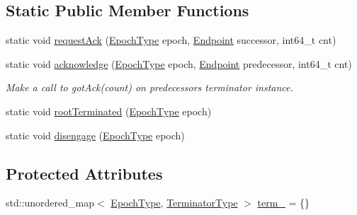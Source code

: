 \subsection*{Static Public Member Functions}
\begin{DoxyCompactItemize}
\item 
static void \hyperlink{structvt_1_1term_1_1ds_1_1_state_d_s_acdf0151492a1e35c6565c65b138e8ac9}{request\+Ack} (\hyperlink{namespacevt_a81d11b28122d43bf9834577e4a06440f}{Epoch\+Type} epoch, \hyperlink{structvt_1_1term_1_1ds_1_1_state_d_s_aba302de614dd639f5d93f4f5b6dd6108}{Endpoint} successor, int64\+\_\+t cnt)
\item 
static void \hyperlink{structvt_1_1term_1_1ds_1_1_state_d_s_a60aafca7a5eef1368e55c02508a0f3bf}{acknowledge} (\hyperlink{namespacevt_a81d11b28122d43bf9834577e4a06440f}{Epoch\+Type} epoch, \hyperlink{structvt_1_1term_1_1ds_1_1_state_d_s_aba302de614dd639f5d93f4f5b6dd6108}{Endpoint} predecessor, int64\+\_\+t cnt)
\begin{DoxyCompactList}\small\item\em Make a call to got\+Ack(count) on predecessor\textquotesingle{}s terminator instance. \end{DoxyCompactList}\item 
static void \hyperlink{structvt_1_1term_1_1ds_1_1_state_d_s_a26ae9b485dbb46e46b48e73a321cfd8b}{root\+Terminated} (\hyperlink{namespacevt_a81d11b28122d43bf9834577e4a06440f}{Epoch\+Type} epoch)
\item 
static void \hyperlink{structvt_1_1term_1_1ds_1_1_state_d_s_a55a5290621f7de06a421793daba374e8}{disengage} (\hyperlink{namespacevt_a81d11b28122d43bf9834577e4a06440f}{Epoch\+Type} epoch)
\end{DoxyCompactItemize}
\subsection*{Protected Attributes}
\begin{DoxyCompactItemize}
\item 
std\+::unordered\+\_\+map$<$ \hyperlink{namespacevt_a81d11b28122d43bf9834577e4a06440f}{Epoch\+Type}, \hyperlink{structvt_1_1term_1_1ds_1_1_state_d_s_af98cfe31c25f710273ee103026d538e4}{Terminator\+Type} $>$ \hyperlink{structvt_1_1term_1_1ds_1_1_state_d_s_a97a12b9645ebe99171d7680baab34b5d}{term\+\_\+} = \{\}
\end{DoxyCompactItemize}
